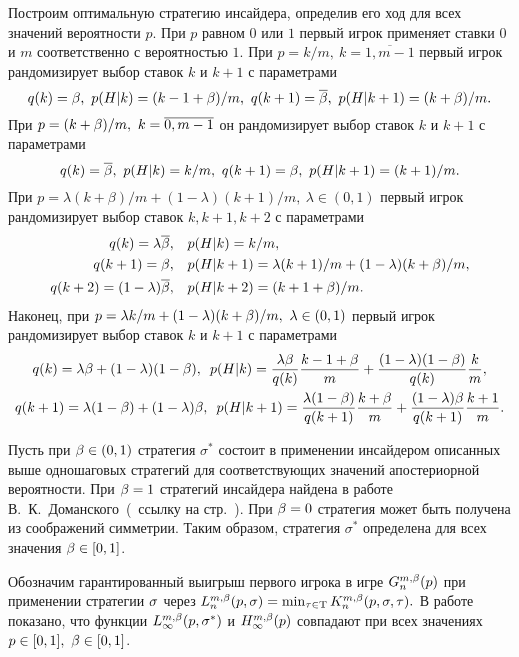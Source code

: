 Построим оптимальную стратегию инсайдера, определив его ход для всех значений вероятности $p$.
При $p$ равном $0$ или $1$ первый игрок применяет ставки $0$ и $m$ соответственно с вероятностью $1$.
При $p = k/m,\ k = \overline{1, m-1}$ первый игрок рандомизирует выбор ставок $k$ и $k+1$ с параметрами
\begin{equation*}
  q(k) = \beta,\ p(H|k) = (k-1+\beta)/m,\
  q(k+1) = {{\overline{\beta}}},\ p(H|k + 1) = (k+\beta)/m.
\end{equation*}
При $p = (k+\beta)/m,\ k = \overline{0, m-1}$ он рандомизирует выбор ставок $k$ и $k+1$ с параметрами
\begin{equation*}
  q(k) = {{\overline{\beta}}},\ p(H|k) = k/m,\
  q(k+1) = \beta,\ p(H|k+1) = (k+1)/m.
\end{equation*}
При $p = \lambda (k+\beta)/m + (1-\lambda) (k+1)/m,\ \lambda \in (0, 1)$ первый игрок рандомизирует выбор ставок $k, k+1, k+2$ с параметрами
\begin{align*}
  q(k) = \lambda{{\overline{\beta}}}, &\quad p(H|k) = k/m,\\
  q(k+1) = \beta, &\quad p(H|k+1) = \lambda (k+1)/m + (1-\lambda) (k+\beta)/m,\\
  q(k+2) = (1-\lambda){{\overline{\beta}}}, &\quad p(H|k+2) = (k+1+\beta)/m.
\end{align*}
Наконец, при $p = \lambda k/m + (1-\lambda) (k+\beta)/m,\ \lambda \in (0, 1)$ первый игрок рандомизирует выбор ставок $k$ и $k+1$ с параметрами
\begin{gather*}
  q(k) = \lambda\beta + (1-\lambda)(1-\beta),\enskip
  p(H|k) = \frac{\lambda\beta}{q(k)} \frac{k-1+\beta}{m} + \frac{(1-\lambda)(1-\beta)}{q(k)} \frac{k}{m},\\
  q(k+1) = \lambda(1-\beta) + (1-\lambda)\beta,\enskip
  p(H|k+1) = \frac{\lambda(1-\beta)}{q(k+1)} \frac{k+\beta}{m} + \frac{(1-\lambda)\beta}{q(k+1)} \frac{k+1}{m}.
\end{gather*}

Пусть при $\beta \in (0,1)$ стратегия $\sigma^*$ состоит в применении инсайдером описанных выше одношаговых стратегий для соответствующих значений апостериорной вероятности. 
При $\beta = 1$ стратегий инсайдера найдена в работе В.~К.~Доманского~(\seename~ссылку на стр.~\pageref{domansky07ref}).
При $\beta = 0$ стратегия может быть получена из соображений симметрии. 
Таким образом, стратегия $\sigma^*$ определена для всех значения $\beta \in [0,1]$.

Обозначим гарантированный выигрыш первого игрока в игре $\theG*{n}(p)$ при применении стратегии $\sigma$ через
$
  \L*{n}(p, \sigmar) = \min_{\taur \in \Tau} \K*{n}(p,\sigmar,\taur).
$
В работе показано, что функции $\L*{\infty}(p, \sigmar^*)$ и $\H*{\infty}(p)$ совпадают при всех значениях $p \in [0,1],\ \beta \in [0,1]$.

